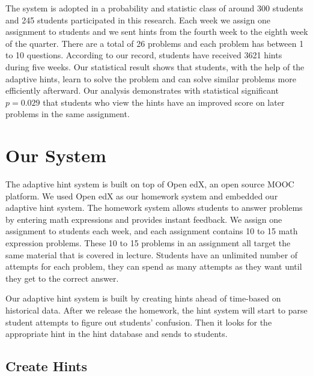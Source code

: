 \documentclass{llncs}
\begin{document}
The system is adopted in a probability and statistic class of around 300 students and 245 students participated in this research. Each week we assign one assignment to students and we sent hints from the fourth week to the eighth week of the quarter. There are a total of 26 problems and each problem has between 1 to 10 questions. According to our record, students have received 3621 hints during five weeks. Our statistical result shows that students, with the help of the adaptive hints, learn to solve the problem and can solve similar problems more efficiently afterward. Our analysis demonstrates with statistical significant $p=0.029$ that students who view the hints have an improved score on later problems in the same assignment.



\section{Our System}
The adaptive hint system is built on top of Open edX, an open source MOOC platform. We used Open edX as our homework system and embedded our adaptive hint system. The homework system allows students to answer problems by entering math expressions and provides instant feedback. We assign one assignment to students each week, and each assignment contains 10 to 15 math expression problems. These 10 to 15 problems in an assignment all target the same material that is covered in lecture. Students have an unlimited number of attempts for each problem, they can spend as many attempts as they want until they get to the correct answer.

Our adaptive hint system is built by creating hints ahead of time-based on historical data. After we release the homework, the hint system will start to parse student attempts to figure out students' confusion. Then it looks for the appropriate hint in the hint database and sends to students.

\subsection*{Create Hints}
\end{document}

